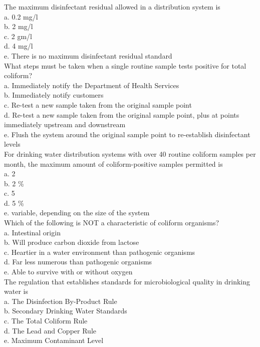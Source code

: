 The maximum disinfectant residual allowed in a distribution system is\\
a. 0.2 mg/l\\
b. 2 mg/l\\
c. 2 gm/l\\
d. 4 mg/l\\
e. There is no maximum disinfectant residual standard\\

What steps must be taken when a single routine sample tests positive for total coliform?\\
a. Immediately notify the Department of Health Services\\
b. Immediately notify customers\\
c. Re-test a new sample taken from the original sample point\\
d. Re-test a new sample taken from the original sample point, plus at points immediately upstream and downstream\\
e. Flush the system around the original sample point to re-establish disinfectant levels\\

For drinking water distribution systems with over 40 routine coliform samples per month, the maximum amount of coliform-positive samples permitted is\\
a. 2\\
b. 2 \%\\
c. 5\\
d. 5 \%\\
e. variable, depending on the size of the system\\

Which of the following is NOT a characteristic of coliform organisms?\\
a. Intestinal origin\\
b. Will produce carbon dioxide from lactose\\
c. Heartier in a water environment than pathogenic organisms\\
d. Far less numerous than pathogenic organisms\\
e. Able to survive with or without oxygen\\

The regulation that establishes standards for microbiological quality in drinking water is\\
a. The Disinfection By-Product Rule\\
b. Secondary Drinking Water Standards\\
c. The Total Coliform Rule\\
d. The Lead and Copper Rule\\
e. Maximum Contaminant Level\\

